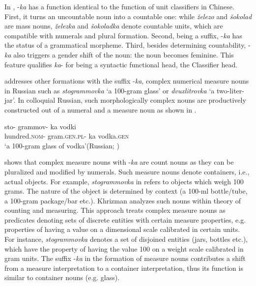 \documentclass[output=paper,
colorlinks,
citecolor=brown,
newtxmath
]{langscibook}
\begin{document}
\noindent In , -\textit{ka} has a function identical to the function of unit classifiers in Chinese. First,  it turns an uncountable noun into a countable one: while \textit{železo} and \textit{šokolad} are mass nouns, \textit{železka} and \textit{šokoladka} denote countable units, which are compatible with numerals and plural formation. Second, being a suffix, -\textit{ka} has the status of a grammatical morpheme. Third, besides determining countability, -\textit{ka} also triggers a gender shift of the noun: the noun becomes feminine. This feature qualifies \textit{ka}- for being a syntactic functional head, the Classifier head.

 addresses other formations with the suffix -\textit{ka}, complex numerical measure nouns in Russian such as \textit{stogrammovka} `a 100-gram glass' or \textit{dvuxlitrovka} `a two-liter-jar'. In colloquial Russian, such morphologically complex nouns are productively constructed out of a numeral and a measure noun as shown in .

\ea \label{ex:19}
\gll sto- 	grammov- 	ka 		vodki\\
  hundred.\textsc{nom}-	gram.\textsc{gen.pl}-	ka 					vodka.\textsc{gen} \\
\glt `a 100-gram glass of vodka'\hfill (Russian; )
\z

\noindent \citeauthor{Khrizman2021} shows that complex measure nouns with -\textit{ka} are count nouns as they can be pluralized and modified by numerals. Such measure nouns denote containers, i.e., actual objects. For example, \textit{stogrammovka} in  refers to objects which weigh 100 grams. The nature of the object is determined by context (a 100-ml bottle/tube, a 100-gram package/bar etc.). Khrizman analyzes such nouns within  theory of counting and measuring. This approach treats complex measure nouns as predicates denoting sets of discrete entities with certain measure properties, e.g. properties of having a value on a dimensional scale calibrated in certain units. For instance, \textit{stogrammovka} denotes a set of disjoined entities (jars, bottles etc.), which have the property of having the value 100 on a weight scale calibrated in gram units. The suffix -\textit{ka} in the formation of measure nouns contributes a shift from a measure interpretation to a container interpretation, thus its function is similar to container nouns (e.g. glass).

\end{document}
